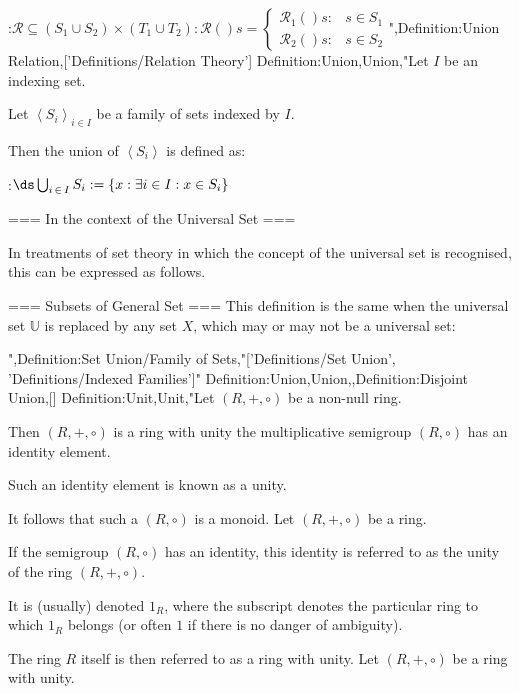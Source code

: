 :$\mathcal R \subseteq \left( S_1 \cup S_2 \right) \times \left( T_1 \cup T_2 \right): \mathcal R \left(   \right)s =
\begin{cases}
 \mathcal R_1 \left(   \right)s : & s \in S_1 \\
 \mathcal R_2 \left(   \right)s : & s \in S_2
\end{cases}$",Definition:Union Relation,['Definitions/Relation Theory']
Definition:Union,Union,"Let $I$ be an indexing set.

Let $\left\langle S_i \right\rangle_{i \mathop \in I}$ be a family of sets indexed by $I$.


Then the union of $\left\langle S_i \right\rangle$ is defined as:

:$\ds \bigcup_{i \mathop \in I} S_i := \left\lbrace x: \exists i \in I: x \in S_i \right\rbrace$


=== In the context of the Universal Set ===

In treatments of set theory in which the concept of the universal set is recognised, this can be expressed as follows.



=== Subsets of General Set ===
This definition is the same when the universal set $\mathbb U$ is replaced by any set $X$, which may or may not be a universal set:

",Definition:Set Union/Family of Sets,"['Definitions/Set Union', 'Definitions/Indexed Families']"
Definition:Union,Union,,Definition:Disjoint Union,[]
Definition:Unit,Unit,"Let $\left( R, +, \circ \right)$ be a non-null ring.

Then $\left( R, +, \circ \right)$ is a ring with unity  the multiplicative semigroup $\left( R, \circ \right)$ has an identity element.

Such an identity element is known as a unity.


It follows that such a $\left( R, \circ \right)$ is a monoid.
Let $\left( R, +, \circ \right)$ be a ring.

If the semigroup $\left( R, \circ \right)$ has an identity, this identity is referred to as the unity of the ring $\left( R, +, \circ \right)$.

It is (usually) denoted $1_R$, where the subscript denotes the particular ring to which $1_R$ belongs (or often $1$ if there is no danger of ambiguity).


The ring $R$ itself is then referred to as a ring with unity.
Let $\left( R, +, \circ \right)$ be a ring with unity.


